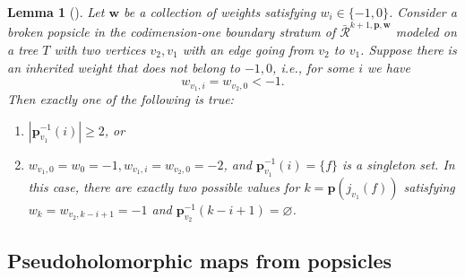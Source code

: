 \documentclass[11pt]{amsproc}
\def\cR{\mathcal{R}}
\newtheorem{lem}{Lemma}[section]
\theoremstyle{remark}
\numberwithin{equation}{section}
\begin{document}
\begin{lem}[{\cite[Lemma 4.2]{seidel6}}]
Let $\mathbf{w}$ be a collection of weights satisfying $w_{i} \in \{-1, 0\}$.
Consider a broken popsicle in the codimension-one boundary stratum of $\bar{\cR}^{k+1, \mathbf{p}, \mathbf{w}}$ modeled on a tree $T$ with two vertices $v_{2}, v_{1}$ with an edge going from $v_{2}$ to $v_{1}$.
Suppose there is an inherited weight that does not belong to $-1, 0$, i.e., for some $i$ we have
\begin{equation}
w_{v_{1}, i} = w_{v_{2}, 0} < -1.
\end{equation}
Then exactly one of the following is true:
\begin{enumerate}[label=(\roman*)]

\item $|\mathbf{p}_{v_{1}}^{-1}(i)| \ge 2$, or

\item $w_{v_{1}, 0 } = w_{0} = -1, w_{v_{1}, i} = w_{v_{2}, 0} = -2$, 
and $\mathbf{p}_{v_{1}}^{-1}(i) = \{f\}$ is a singleton set.
In this case, there are exactly two possible values for $k = \mathbf{p}(j_{v_{1}}(f))$ satisfying $w_{k} = w_{v_{2}, k-i+1} = -1$ and $\mathbf{p}_{v_{2}}^{-1}(k-i+1) = \varnothing$.

\end{enumerate}
\end{lem}

\subsection{Pseudoholomorphic maps from popsicles}
\end{document}
